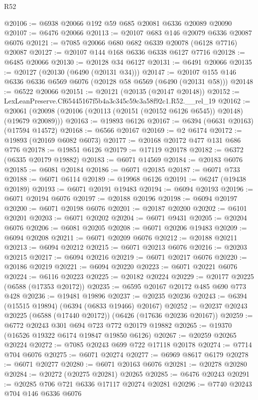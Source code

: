 \begin{lexlean}{R52}
\begin{coremodule}
@20106 := @6938 @20066 @192 @59 @685 @20081 @6336 @20089 @20090
@20107 := @6476 @20066
@20113 := @20107 @683 @146 @20079 @6336 @20087 @6076
@20121 := @7085 @20066 @680 @682 @6339 @20078 (@6128 @7716) @20087
@20127 := @20107 @144 @168 @6336 @6338 @6127 @7716
@20128 := @6485 @20066
@20130 := @20128 @34 @6127
@20131 := @6491 @20066
@20135 := @20127 (@20130 (@6490 (@20131 @34)))
@20147 := @20107 @155 @146 @6336 @6336 @6569 @6076 (@20128 @58 @6569 (@6490 (@20131 @58)))
@20148 := @6522 @20066
@20151 := @20121 (@20135 (@20147 @20148))
@20152 := LexLeanPreserve.Cf65445167f5b4a3c345c59c3a58f92c1.R52.__rel_19
@20162 := @20061 (@20098 (@20106 (@20113 (@20151 (@20152 @6126 @6545)) @20148) (@19679 @20089)))
@20163 := @19893 @6126
@20167 := @6394 (@6631 @20163) (@17594 @14572)
@20168 := @6566 @20167
@20169 := @2 @6174
@20172 := @19893 (@20169 @6082 @6073)
@20177 := @20168 @20172 @477 @131 @686 @776
@20178 := @19851 @6126
@20179 := @17119 @20178
@20182 := @6372 (@6335 @20179 @19882)
@20183 := @6071 @14569
@20184 := @20183 @6076
@20185 := @6081 @20184
@20186 := @6071 @20185
@20187 := @6071 @733
@20188 := @6071 @6114
@20189 := @19968 @6126
@20191 := @6247 (@19438 @20189)
@20193 := @6071 @20191 @19483
@20194 := @6094 @20193
@20196 := @6071 @20194 @6076
@20197 := @20188 @20196
@20198 := @6094 @20197
@20200 := @6071 @20198 @6076
@20201 := @20187 @20200
@20202 := @6101 @20201
@20203 := @6071 @20202
@20204 := @6071 @9431
@20205 := @20204 @6076
@20206 := @6081 @20205
@20208 := @6071 @20206 @19483
@20209 := @6094 @20208
@20211 := @6071 @20209 @6076
@20212 := @20188 @20211
@20213 := @6094 @20212
@20215 := @6071 @20213 @6076
@20216 := @20203 @20215
@20217 := @6094 @20216
@20219 := @6071 @20217 @6076
@20220 := @20186 @20219
@20221 := @6094 @20220
@20223 := @6071 @20221 @6076
@20224 := @6116 @20223
@20225 := @20182 @20224
@20229 := @20177 @20225 (@6588 (@17353 @20172))
@20235 := @6595 @20167 @20172 @485 @690 @773 @428
@20236 := @19481 @19896
@20237 := @20235 @20236
@20243 := @6394 (@15515 @19894) (@6394 (@6833 @19466) @20167)
@20252 := @20237 @20243 @20225 (@6588 (@17440 @20172)) (@6426 (@17636 @20236 @20167))
@20259 := @6772 @20243 @301 @694 @723 @772 @20179 @19882
@20265 := @19370 (@16526 @19322 @6174 @19847 @19850 @6126)
@20267 := @20259 @20265 @20224
@20272 := @7085 @20243 @699 @722 @17118 @20178
@20274 := @7714 @704 @6076
@20275 := @6071 @20274
@20277 := @6969 @8617 @6179
@20278 := @6071 @20277
@20280 := @6071 @20163 @6076
@20281 := @20278 @20280
@20284 := @20272 (@20275 @20281) @20265
@20285 := @6476 @20243
@20291 := @20285 @706 @721 @6336 @17117 @20274 @20281
@20296 := @7740 @20243 @704 @146 @6336 @6076

\end{coremodule}
\end{lexlean}
